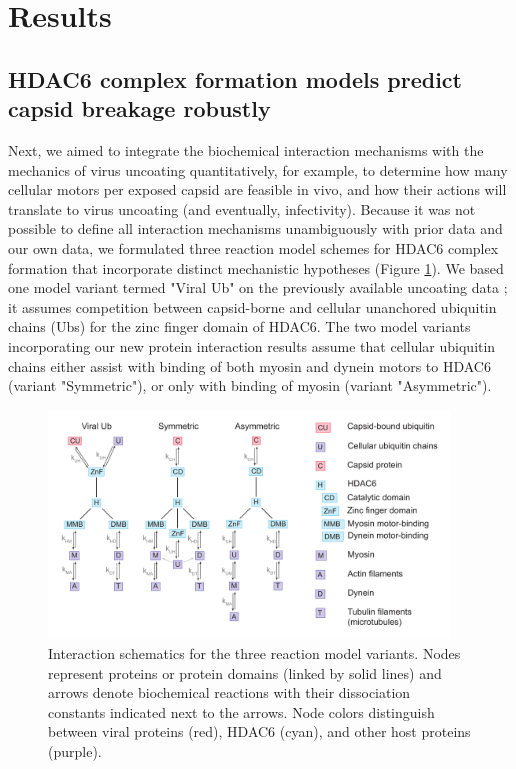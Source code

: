 \section{Results}

\subsection{HDAC6 complex formation models predict capsid breakage robustly}

Next, we aimed to integrate the biochemical interaction mechanisms with the mechanics of virus uncoating quantitatively, for example, to determine how many cellular motors per exposed capsid are feasible in vivo, and how their actions will translate to virus uncoating (and eventually, infectivity). Because it was not possible to define all interaction mechanisms unambiguously with prior data and our own data, we formulated three reaction model schemes for HDAC6 complex formation that incorporate distinct mechanistic hypotheses (Figure \ref{figure:ReactionModelSchemes}). We based one model variant termed "Viral Ub" on the previously available uncoating data \cite{banerjee2014influenza}; it assumes competition between capsid-borne and cellular unanchored ubiquitin chains (Ubs) for the zinc finger domain of HDAC6. The two model variants incorporating our new protein interaction results assume that cellular ubiquitin chains either assist with binding of both myosin and dynein motors to HDAC6 (variant "Symmetric"), or only with binding of myosin (variant "Asymmetric").

\begin{figure}
\begin{center}
\includegraphics[width=0.95\textwidth, trim={0cm 0cm 0cm 0cm}, clip]{D_chapters/2_ReactionModel/ReactionModels.pdf}
\caption[Interaction schematics for the three reaction model variants]%
{Interaction schematics for the three reaction model variants. Nodes represent proteins or protein domains (linked by solid lines) and arrows denote biochemical reactions with their dissociation constants indicated next to the arrows. Node colors distinguish between viral proteins (red), HDAC6 (cyan), and other host proteins (purple).}
\label{figure:ReactionModelSchemes}
\end{center}
\end{figure}

